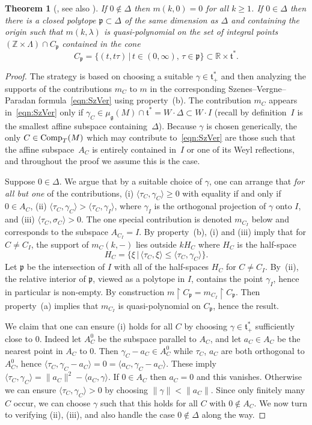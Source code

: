 \documentclass[11pt]{article}
\numberwithin{equation}{section}
\newtheorem{Theorem}{Theorem}[section]
\newcommand{\pair}[2]{\langle #1, #2 \rangle}
\newcommand{\tn}[1]{\textnormal{#1}}
\def\g{\ensuremath{\mathfrak{g}}}
\def\t{\ensuremath{\mathfrak{t}}}
\def\p{\ensuremath{\mathfrak{p}}}
\def\bR{\ensuremath{\mathbb{R}}}
\def\bZ{\ensuremath{\mathbb{Z}}}
\begin{document}
\begin{Theorem}[\cite{MeinrenkenSjamaar}, see also \cite{ParadanRiemannRoch, ParadanWallCrossing, WittenNonAbelian}]\label{thm:qp}
If $0 \notin \Delta$ then $m(k,0)=0$ for all $k \ge 1$. If $0 \in \Delta$ then there is a closed polytope $\p \subset \Delta$ of the same dimension as $\Delta$ and containing the origin such that $m(k,\lambda)$ is quasi-polynomial on the set of integral points $(\bZ \times \Lambda) \cap C_\p$ contained in the cone
\[ C_\p=\{(t,t\tau)\,|\,t \in (0,\infty), \,\tau \in \p \} \subset \bR \times \t^\ast.\]
\end{Theorem}
\begin{proof}The strategy is based on choosing a suitable $\gamma \in \t^\ast_+$ and then analyzing the supports of the contributions $m_C$ to $m$ in the corresponding Szenes--Vergne--Paradan formula~\eqref{eqn:SzVer} using property~(b). The contribution $m_C$ appears in~\eqref{eqn:SzVer} only if $\gamma_C \in \mu_\g(M)\cap \t^\ast=W \cdot \Delta \subset W \cdot I$ (recall by definition~$I$ is the smallest affine subspace containing~$\Delta$). Because $\gamma$ is chosen generically, the only $C \in \tn{Comp}_T(M)$ which may contribute to~\eqref{eqn:SzVer} are those such that the affine subspace~$A_C$ is entirely contained in~$I$ or one of its Weyl reflections, and throughout the proof we assume this is the case.

Suppose $0 \in \Delta$. We argue that by a suitable choice of $\gamma$, one can arrange that \emph{for all but one} of the contributions, (i) $\pair{\tau_C}{\gamma_C}\ge 0$ with equality if and only if $0 \in A_C$, (ii) $\pair{\tau_C}{\gamma_C}>\pair{\tau_C}{\gamma_I}$, where $\gamma_I$ is the orthogonal projection of $\gamma$ onto $I$, and (iii) $\pair{\tau_C}{\sigma_C}>0$. The one special contribution is denoted $m_{C_I}$ below and corresponds to the subspace $A_{C_I}=I$. By property~(b), (i) and (iii) imply that for $C \ne C_I$, the support of $m_C(k,-)$ lies outside $kH_C$ where $H_C$ is the half-space
\[ H_C=\{\xi \,|\, \pair{\tau_C}{\xi}\le \pair{\tau_C}{\gamma_C}\}.\]
Let $\p$ be the intersection of $I$ with all of the half-spaces $H_C$ for $C \ne C_I$. By~(ii), the relative interior of $\p$, viewed as a polytope in $I$, contains the point $\gamma_I$, hence in particular is non-empty. By construction $m\upharpoonright C_\p=m_{C_I}\upharpoonright C_\p$. Then property~(a) implies that $m_{C_I}$ is quasi-polynomial on $C_\p$, hence the result.

We claim that one can ensure (i) holds for all $C$ by choosing $\gamma \in \t^\ast_+$ sufficiently close to $0$. Indeed let $A_C^0$ be the subspace parallel to $A_C$, and let $a_C \in A_C$ be the nearest point in $A_C$ to $0$. Then $\gamma_C-a_C \in A_C^0$ while $\tau_C$, $a_C$ are both orthogonal to $A_C^0$, hence $\pair{\tau_C}{\gamma_C-a_C}=0=\pair{a_C}{\gamma_C-a_C}$. These imply $\pair{\tau_C}{\gamma_C}=\|a_C\|^2-\pair{a_C}{\gamma}$. If $0 \in A_C$ then $a_C=0$ and this vanishes. Otherwise we can ensure $\pair{\tau_C}{\gamma_C}>0$ by choosing $\|\gamma\|<\|a_C\|$. Since only finitely many $C$ occur, we can choose $\gamma$ such that this holds for all $C$ with $0 \notin A_C$. We now turn to verifying (ii), (iii), and also handle the case $0 \notin \Delta$ along the way.


\end{proof}
\end{document}
